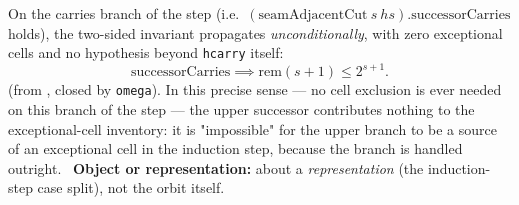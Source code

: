 \begin{prop}
\label{prop:upper-unconditional}
On the carries branch of the step (i.e.\ $(\mathrm{seamAdjacentCut}\ s\ hs).\mathrm{successorCarries}$
holds), the two-sided invariant propagates \emph{unconditionally}, with zero exceptional cells and
no hypothesis beyond \texttt{hcarry} itself:
\[
  \mathrm{successorCarries} \implies \mathrm{rem}(s+1) \le 2^{s+1}.
\]
(from
,
closed by \texttt{omega}). In this precise sense — no cell exclusion is ever needed on this branch
of the step — the upper successor contributes nothing to the exceptional-cell inventory: it is
"impossible" for the upper branch to be a source of an exceptional cell in the induction step,
because the branch is handled outright.
\ \textbf{Object or representation:} about a
\emph{representation} (the induction-step case split), not the orbit itself.
\end{prop}


